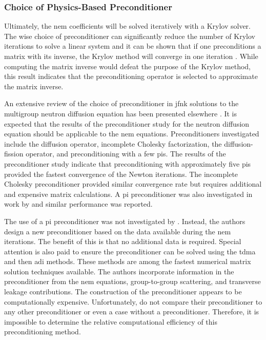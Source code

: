     \subsubsection{Choice of Physics-Based Preconditioner}

      Ultimately, the \gls{nem} coefficients will be solved iteratively with a
      Krylov solver. The wise choice of preconditioner can significantly reduce 
      the number of Krylov iterations to solve a linear system and it can be
      shown that if one preconditions a matrix with its inverse, the Krylov
      method will converge in one iteration \cite{textbookkelley}. While
      computing the matrix inverse would defeat the purpose of the Krylov
      method, this result indicates that the preconditioning operator is
      selected to approximate the matrix inverse.

      An extensive review of the choice of preconditioner in \gls{jfnk}
      solutions to the multigroup neutron diffusion equation has been presented
      elsewhere \cite{gill_azmy}. It is expected that the results of the
      preconditioner study for the neutron diffusion equation should be
      applicable to the \gls{nem} equations. Preconditioners investigated
      include the diffusion operator, incomplete Cholesky factorization, the
      diffusion-fission operator, and preconditioning with a few \glspl{pi}.
      The results of the preconditioner study indicate that preconditioning with
      approximately five \glspl{pi} provided the fastest convergence of the
      Newton iterations. The incomplete Cholesky preconditioner provided similar
      convergence rate but requires additional and expensive matrix
      calculations. A \gls{pi} preconditioner was also investigated in work by
      \citeauthor{jfnk_wielandt} and similar performance was reported.

      The use of a \gls{pi} preconditioner was not investigated by
      \citeauthor{qe2paper}. Instead, the authors design a new
      preconditioner based on the data available during the \gls{nem}
      iterations. The benefit of this is that no additional data is required.
      Special attention is also paid to ensure the preconditioner can be solved
      using the \gls{tdma} and then \gls{adi} methods. These methods are among
      the fastest numerical matrix solution techniques available. The authors
      incorporate information in the preconditioner from the \gls{nem}
      equations, group-to-group scattering, and transverse leakage
      contributions. The construction of the preconditioner appears to be 
      computationally expensive. Unfortunately, \citeauthor{qe2paper} do not
      compare their preconditioner to any other preconditioner or even a case
      without a preconditioner. Therefore, it is impossible to determine the
      relative computational efficiency of this preconditioning method.

